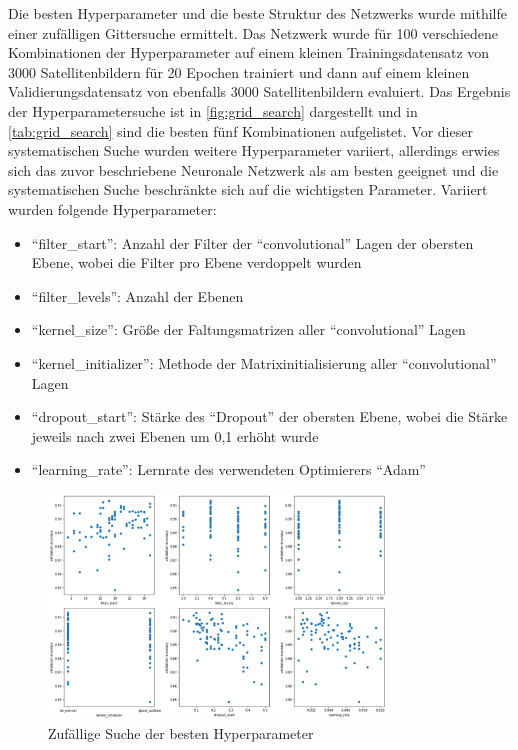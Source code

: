 Die besten Hyperparameter und die beste Struktur des Netzwerks wurde mithilfe einer zufälligen Gittersuche ermittelt.
Das Netzwerk wurde für 100 verschiedene Kombinationen der Hyperparameter auf einem kleinen Trainingsdatensatz von 3000 Satellitenbildern für 20 Epochen trainiert
und dann auf einem kleinen Validierungsdatensatz von ebenfalls 3000 Satellitenbildern evaluiert.
Das Ergebnis der Hyperparametersuche ist in \autoref{fig:grid_search} dargestellt und in \autoref{tab:grid_search} sind die besten fünf Kombinationen aufgelistet.
Vor dieser systematischen Suche wurden weitere Hyperparameter variiert, allerdings erwies sich das zuvor beschriebene Neuronale Netzwerk als am besten geeignet
und die systematischen Suche beschränkte sich auf die wichtigsten Parameter.
Variiert wurden folgende Hyperparameter:

\begin{itemize}
    \item \enquote{filter\_start}: Anzahl der Filter der \enquote{convolutional} Lagen der obersten Ebene, wobei die Filter pro Ebene verdoppelt wurden
    \item \enquote{filter\_levels}: Anzahl der Ebenen
    \item \enquote{kernel\_size}: Größe der Faltungsmatrizen aller \enquote{convolutional} Lagen
    \item \enquote{kernel\_initializer}: Methode der Matrixinitialisierung aller \enquote{convolutional} Lagen
    \item \enquote{dropout\_start}: Stärke des \enquote{Dropout} der obersten Ebene, wobei die Stärke jeweils nach zwei Ebenen um 0,1 erhöht wurde
    \item \enquote{learning\_rate}: Lernrate des verwendeten Optimierers \enquote{Adam}
\end{itemize}

\begin{figure}
    \centering
    \includegraphics[width=0.8\textwidth]{images/grid_search.png}
    \caption{Zufällige Suche der besten Hyperparameter}
    \label{fig:grid_search}
\end{figure}

